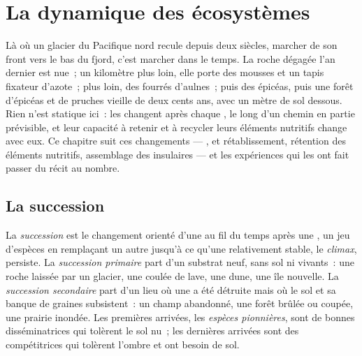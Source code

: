 \chapter{La dynamique des écosystèmes}\label{ch:b1:ecosystem-dynamics}

Là où un glacier du Pacifique nord recule depuis deux siècles, marcher
de son front vers le bas du fjord, c'est marcher dans le temps. La
roche dégagée l'an dernier est nue~; un kilomètre plus loin, elle porte
des mousses et un tapis fixateur d'azote~; plus loin, des fourrés
d'aulnes~; puis des épicéas, puis une forêt d'épicéas et de pruches
vieille de deux cents ans, avec un mètre de sol dessous. Rien n'est
statique ici~: les  changent après chaque , le
long d'un chemin en partie prévisible, et leur capacité à retenir et à
recycler leurs éléments nutritifs change avec eux. Ce chapitre suit ces
changements --- ,  et rétablissement, rétention
des éléments nutritifs, assemblage des  insulaires --- et les
expériences qui les ont fait passer du récit au nombre.

\section{La succession}

\begin{definition}\label{def:b1:ecosystem-dynamics:succession}
La \emph{succession} est le changement orienté d'une  au fil
du temps après une , un jeu d'espèces en remplaçant un
autre jusqu'à ce qu'une  relativement stable, le
\emph{climax}, persiste. La \emph{succession primaire} part d'un
substrat neuf, sans sol ni  vivants~: une roche laissée par un
glacier, une coulée de lave, une dune, une île nouvelle. La
\emph{succession secondaire} part d'un lieu où une  a été
détruite mais où le sol et sa banque de graines subsistent~: un champ
abandonné, une forêt brûlée ou coupée, une prairie inondée. Les
premières arrivées, les \emph{espèces pionnières}, sont de bonnes
disséminatrices qui tolèrent le sol nu~; les dernières arrivées sont des
compétitrices qui tolèrent l'ombre et ont besoin de sol.
\end{definition}

